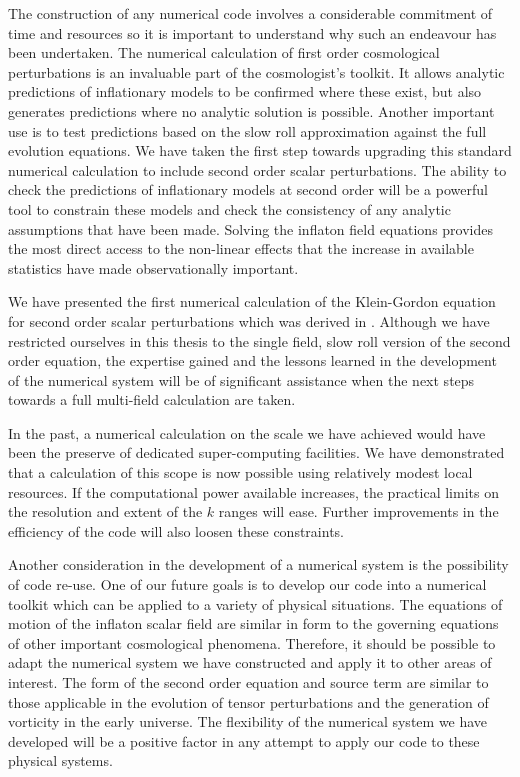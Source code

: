 The construction of any numerical code involves a considerable commitment of time
and resources so it is important to understand why such an endeavour has been
undertaken. 
The numerical calculation of first order cosmological perturbations is an invaluable
part of the cosmologist's toolkit. It allows analytic predictions of inflationary
models to be confirmed where these exist, but also generates predictions where no
analytic solution is possible. Another important use is to test predictions based
on the slow roll approximation  against the full evolution equations. 
% 
We have taken the first step towards upgrading this standard numerical calculation to
include second order scalar perturbations. 
% 
The ability to check the predictions of inflationary models at second order will
be a powerful tool to constrain these models and check the consistency of any
analytic assumptions that have been made. Solving the inflaton field equations
provides the most direct access to the non-linear effects that the increase in
available statistics have made observationally important.
% 

We have presented the
first numerical calculation of the Klein-Gordon equation for second order scalar
perturbations which was derived in . Although we have restricted
ourselves in this thesis to the single field, slow roll version of the second order
equation,
the expertise gained and the lessons learned in the development of the numerical
system will be of significant assistance when the next steps towards a full
multi-field calculation are taken. 
% 


In the past, a numerical calculation on the scale we have achieved would have been
the preserve of dedicated super-computing facilities. We have demonstrated that a
calculation of this scope is now possible using relatively modest local resources.
If the computational power available increases, the practical limits on the
resolution and extent of the $k$ ranges will ease. Further improvements in the
efficiency of the code will also loosen these constraints.
% 

Another consideration in the development of a numerical system is the possibility of
code re-use. One of our future goals is to develop our code into a numerical toolkit which
can be applied to a variety of physical situations.
The equations of motion of the inflaton scalar field are similar in form
to the governing equations of other important cosmological phenomena. Therefore, it
should be possible to adapt the numerical system we have constructed and apply it to
other areas of interest. The form of the second order equation and source term are similar to those
applicable in the evolution of tensor perturbations and the
generation of vorticity in the early universe. The flexibility of the numerical system we have
developed will be a positive factor in any attempt to apply our code to these physical systems. 


